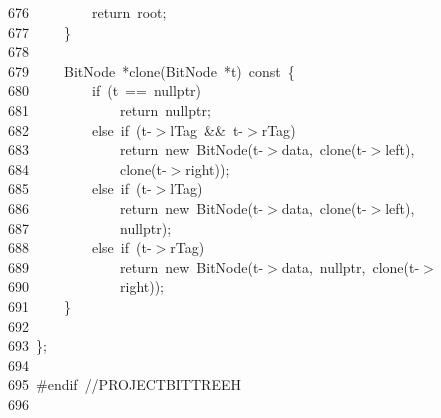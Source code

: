 \documentclass[11pt,a4paper]{ctexart}
\newcommand{\hlstd}[1]{\textcolor[rgb]{0.2,0.2,0.2}{#1}}
\newcommand{\hlslc}[1]{\textcolor[rgb]{0.59,0.59,0.59}{#1}}
\newcommand{\hlppc}[1]{\textcolor[rgb]{0.41,0.78,0.23}{#1}}
\newcommand{\hlopt}[1]{\textcolor[rgb]{0.2,0.2,0.2}{#1}}
\newcommand{\hllin}[1]{\textcolor[rgb]{0.59,0.59,0.59}{#1}}
\newcommand{\hlkwa}[1]{\textcolor[rgb]{0.23,0.42,0.78}{#1}}
\newcommand{\hlkwb}[1]{\textcolor[rgb]{0.63,0,0.31}{#1}}
\newcommand{\hlkwc}[1]{\textcolor[rgb]{0,0.63,0.31}{#1}}
\newcommand{\hlkwd}[1]{\textcolor[rgb]{0.78,0.23,0.41}{#1}}
\begin{document}
\hllin{676\ }\hlstd{}\hlstd{\ \ \ \ \ \ \ \ }\hlstd{}\hlkwa{return\ }\hlstd{root}\hlopt{;}\\
\hllin{677\ }\hlstd{}\hlstd{\ \ \ \ }\hlstd{}\hlopt{\}}\\
\hllin{678\ }\hlstd{}\\
\hllin{679\ }\hlstd{}\hlstd{\ \ \ \ }\hlstd{BitNode\ }\hlopt{{*}}\hlstd{}\hlkwd{clone}\hlstd{}\hlopt{(}\hlstd{BitNode\ }\hlopt{{*}}\hlstd{t}\hlopt{)\ }\hlstd{}\hlkwb{const\ }\hlstd{}\hlopt{\{}\\
\hllin{680\ }\hlstd{}\hlstd{\ \ \ \ \ \ \ \ }\hlstd{}\hlkwa{if\ }\hlstd{}\hlopt{(}\hlstd{t\ }\hlopt{==\ }\hlstd{}\hlkwc{nullptr}\hlstd{}\hlopt{)}\\
\hllin{681\ }\hlstd{}\hlstd{\ \ \ \ \ \ \ \ \ \ \ \ }\hlstd{}\hlkwa{return\ }\hlstd{}\hlkwc{nullptr}\hlstd{}\hlopt{;}\\
\hllin{682\ }\hlstd{}\hlstd{\ \ \ \ \ \ \ \ }\hlstd{}\hlkwa{else\ if\ }\hlstd{}\hlopt{(}\hlstd{t}\hlopt{{-}$>$}\hlstd{lTag\ }\hlopt{\&\&\ }\hlstd{t}\hlopt{{-}$>$}\hlstd{rTag}\hlopt{)}\\
\hllin{683\ }\hlstd{}\hlstd{\ \ \ \ \ \ \ \ \ \ \ \ }\hlstd{}\hlkwa{return\ new\ }\hlstd{}\hlkwd{BitNode}\hlstd{}\hlopt{(}\hlstd{t}\hlopt{{-}$>$}\hlstd{data}\hlopt{,\ }\hlstd{}\hlkwd{clone}\hlstd{}\hlopt{(}\hlstd{t}\hlopt{{-}$>$}\hlstd{left}\hlopt{),\ }\Righttorque\\
\hllin{684\ }\hlstd{}\hlstd{\ \ \ \ \ \ \ \ \ \ \ \ }\hlstd{}\hlkwd{clone}\hlstd{}\hlopt{(}\hlstd{t}\hlopt{{-}$>$}\hlstd{right}\hlopt{));}\\
\hllin{685\ }\hlstd{}\hlstd{\ \ \ \ \ \ \ \ }\hlstd{}\hlkwa{else\ if\ }\hlstd{}\hlopt{(}\hlstd{t}\hlopt{{-}$>$}\hlstd{lTag}\hlopt{)}\\
\hllin{686\ }\hlstd{}\hlstd{\ \ \ \ \ \ \ \ \ \ \ \ }\hlstd{}\hlkwa{return\ new\ }\hlstd{}\hlkwd{BitNode}\hlstd{}\hlopt{(}\hlstd{t}\hlopt{{-}$>$}\hlstd{data}\hlopt{,\ }\hlstd{}\hlkwd{clone}\hlstd{}\hlopt{(}\hlstd{t}\hlopt{{-}$>$}\hlstd{left}\hlopt{),\ }\Righttorque\\
\hllin{687\ }\hlstd{}\hlstd{\ \ \ \ \ \ \ \ \ \ \ \ }\hlstd{}\hlkwc{nullptr}\hlstd{}\hlopt{);}\\
\hllin{688\ }\hlstd{}\hlstd{\ \ \ \ \ \ \ \ }\hlstd{}\hlkwa{else\ if\ }\hlstd{}\hlopt{(}\hlstd{t}\hlopt{{-}$>$}\hlstd{rTag}\hlopt{)}\\
\hllin{689\ }\hlstd{}\hlstd{\ \ \ \ \ \ \ \ \ \ \ \ }\hlstd{}\hlkwa{return\ new\ }\hlstd{}\hlkwd{BitNode}\hlstd{}\hlopt{(}\hlstd{t}\hlopt{{-}$>$}\hlstd{data}\hlopt{,\ }\hlstd{}\hlkwc{nullptr}\hlstd{}\hlopt{,\ }\hlstd{}\hlkwd{clone}\hlstd{}\hlopt{(}\hlstd{t}\hlopt{{-}$>$}\Righttorque\\
\hllin{690\ }\hlstd{}\hlstd{\ \ \ \ \ \ \ \ \ \ \ \ }\hlstd{right}\hlopt{));}\\
\hllin{691\ }\hlstd{}\hlstd{\ \ \ \ }\hlstd{}\hlopt{\}}\\
\hllin{692\ }\hlstd{}\\
\hllin{693\ }\hlstd{}\hlopt{\};}\\
\hllin{694\ }\hlstd{}\\
\hllin{695\ }\hlstd{}\hlppc{\#endif\ }\hlslc{//PROJECT\textunderscore BITTREE\textunderscore H}\\
\hllin{696\ }\hlppc{}\hlstd{}\\
\mbox{}
\normalfont
\normalsize
\end{document}
